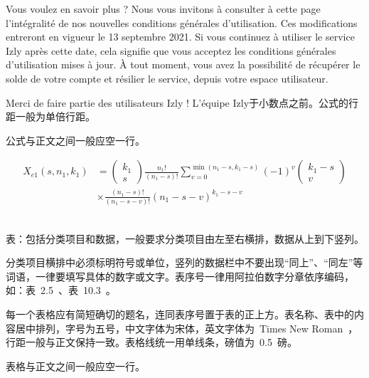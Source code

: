 Vous voulez en savoir plus ?
Nous vous invitons à consulter à cette page l’intégralité de nos nouvelles conditions générales d’utilisation.
Ces modifications entreront en vigueur le 13 septembre 2021. Si vous continuez à utiliser le service Izly après cette date, cela signifie que vous acceptez les conditions générales d’utilisation mises à jour.
À tout moment, vous avez la possibilité de récupérer le solde de votre compte et résilier le service, depuis votre espace utilisateur.

Merci de faire partie des utilisateurs Izly !
L’équipe Izly于小数点之前。公式的行距一般为单倍行距。

公式与正文之间一般应空一行。

\begin{equation}
\begin{split}
{X_{e1}}\left( {s,{n_1},{k_1}} \right) &= \left( {\begin{array}{*{20}{c}}
{{k_1}}\\
s
\end{array}} \right)\frac{{{n_1}!}}{{\left( {{n_1} - s} \right)!}}\sum\nolimits_{v = 0}^{\min \left( {{n_1} - s,{k_1} - s} \right)} {{{\left( { - 1} \right)}^v}\left( {\begin{array}{*{20}{c}}
{{k_1} - s}\\
v
\end{array}} \right)} \\
& \times \frac{{\left( {{n_1} - s} \right)!}}{{\left( {{n_1} - s - v} \right)!}}{\left( {{n_1} - s - v} \right)^{{k_1} - s - v}}
\end{split}
\end{equation}
~\par
表：包括分类项目和数据，一般要求分类项目由左至右横排，数据从上到下竖列。

分类项目横排中必须标明符号或单位，竖列的数据栏中不要出现“同上”、“同左”等词语，一律要填写具体的数字或文字。表序号一律用阿拉伯数字分章依序编码，如：表~2.5~、表~10.3~。

每一个表格应有简短确切的题名，连同表序号置于表的正上方。表名称、表中的内容居中排列，字号为五号，中文字体为宋体，英文字体为~Times New Roman~，行距一般与正文保持一致。表格线统一用单线条，磅值为~0.5~磅。

表格与正文之间一般应空一行。

